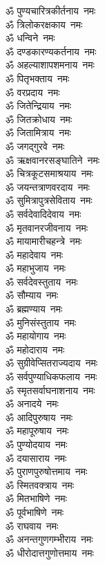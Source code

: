 \begin{multicols}{2}
\begin{flushleft}
ॐ पुण्यचारित्रकीर्तनाय~नमः\hfill{}\\
ॐ त्रिलोकरक्षकाय~नमः\\
ॐ धन्विने~नमः\\
ॐ दण्डकारण्यकर्तनाय~नमः\\
ॐ अहल्याशापशमनाय~नमः\\
ॐ पितृभक्ताय~नमः\\
ॐ वरप्रदाय~नमः\\
ॐ जितेन्द्रियाय~नमः\\
ॐ जितक्रोधाय~नमः\\
ॐ जितामित्राय~नमः\\
ॐ जगद्गुरवे~नमः\hfill{}\\
ॐ ऋक्षवानरसङ्घातिने~नमः\\
ॐ चित्रकूटसमाश्रयाय~नमः\\
ॐ जयन्तत्राणवरदाय~नमः\\
ॐ सुमित्रापुत्रसेविताय~नमः\\
ॐ सर्वदेवादिदेवाय~नमः\\
ॐ मृतवानरजीवनाय~नमः\\
ॐ मायामारीचहन्त्रे~नमः\\
ॐ महादेवाय~नमः\\
ॐ महाभुजाय~नमः\\
ॐ सर्वदेवस्तुताय~नमः\hfill{}\\
ॐ सौम्याय~नमः\\
ॐ ब्रह्मण्याय~नमः\\
ॐ मुनिसंस्तुताय~नमः\\
ॐ महायोगाय~नमः\\
ॐ महोदाराय~नमः\\
ॐ सुग्रीवेप्सितराज्यदाय~नमः\\
ॐ सर्वपुण्याधिकफलाय~नमः\\
ॐ स्मृतसर्वाघनाशनाय~नमः\\
ॐ अनादये~नमः\\
ॐ आदिपुरुषाय~नमः\hfill{}\\
ॐ महापूरुषाय~नमः\\
ॐ पुण्योदयाय~नमः\\
ॐ दयासाराय~नमः\\
ॐ पुराणपुरुषोत्तमाय~नमः\\
ॐ स्मितवक्त्राय~नमः\\
ॐ मितभाषिणे~नमः\\
ॐ पूर्वभाषिणे~नमः\\
ॐ राघवाय~नमः\\
ॐ अनन्तगुणगम्भीराय~नमः\\
ॐ धीरोदात्तगुणोत्तमाय~नमः\hfill{}\\

\end{flushleft}
\end{multicols}
